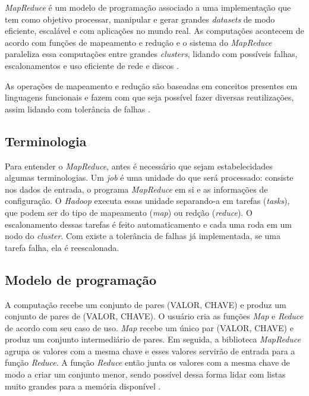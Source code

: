 \textit{MapReduce} é um modelo de programação associado a uma implementação que tem como objetivo processar, manipular e gerar grandes \textit{datasets} de modo eficiente, escalável e com aplicações no mundo real. As computações acontecem de acordo com funções de mapeamento e redução e o sistema do \textit{MapReduce} paraleliza essa computações entre grandes \textit{clusters}, lidando com possíveis falhas, escalonamentos e uso eficiente de rede e discos \cite{MapReduce08}.

As operações de mapeamento e redução são baseadas em conceitos presentes em linguagens funcionais e fazem com que seja possível fazer diversas reutilizações, assim lidando com tolerância de falhas \cite{MapReduce08}.

\subsection{Terminologia}\label{ssec:mapreduceterminlogia}

Para entender o \textit{MapReduce}, antes é necessário que sejam estabelecidades algumas terminologias. Um \textit{job} é uma unidade do que será processado: consiste nos dados de entrada, o programa \textit{MapReduce} em si e as informações de configuração. O \textit{Hadoop} executa essas unidade separando-a em tarefas (\textit{tasks}), que podem ser do tipo de mapeamento (\textit{map}) ou redção (\textit{reduce}). O escalonamento dessas tarefas é feito automaticamento e cada uma roda em um nodo do \textit{cluster}. Com existe a tolerância de falhas já implementada, se uma tarefa falha, ela é reescalonada. \cite{HadoopBook15}

\subsection{Modelo de programação}\label{ssec:mapreducemodelo}

A computação recebe um conjunto de pares (VALOR, CHAVE) e produz um conjunto de pares de (VALOR, CHAVE). O usuário cria as funções \textit{Map} e \textit{Reduce} de acordo com seu caso de uso. \textit{Map} recebe um único par (VALOR, CHAVE) e produz um conjunto intermediário de pares. Em seguida, a biblioteca \textit{MapReduce} agrupa os valores com a mesma chave e esses valores servirão de entrada para a função \textit{Reduce}. A função \textit{Reduce} então junta os valores com a mesma chave de modo a criar um conjunto menor, sendo possível dessa forma lidar com listas muito grandes para a memória disponível \cite{MapReduce08}.

